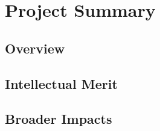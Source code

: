 \documentclass[11pt]{article}
\begin{document}
\section*{Project Summary}


\subsection*{Overview}

\subsection*{Intellectual Merit}

\subsection*{Broader Impacts}
\end{document}

